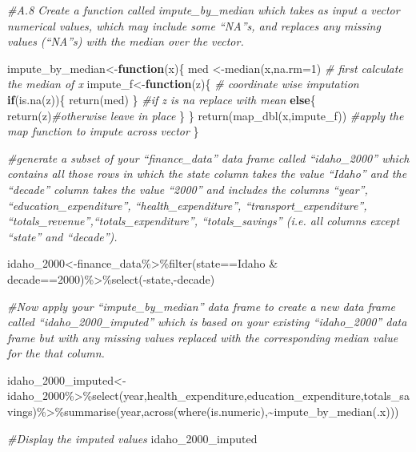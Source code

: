 \documentclass[
]{article}
\newenvironment{Shaded}{\begin{snugshade}}{\end{snugshade}}
\newcommand{\AttributeTok}[1]{\textcolor[rgb]{0.77,0.63,0.00}{#1}}
\newcommand{\CommentTok}[1]{\textcolor[rgb]{0.56,0.35,0.01}{\textit{#1}}}
\newcommand{\ControlFlowTok}[1]{\textcolor[rgb]{0.13,0.29,0.53}{\textbf{#1}}}
\newcommand{\DecValTok}[1]{\textcolor[rgb]{0.00,0.00,0.81}{#1}}
\newcommand{\FunctionTok}[1]{\textcolor[rgb]{0.00,0.00,0.00}{#1}}
\newcommand{\NormalTok}[1]{#1}
\newcommand{\OtherTok}[1]{\textcolor[rgb]{0.56,0.35,0.01}{#1}}
\newcommand{\SpecialCharTok}[1]{\textcolor[rgb]{0.00,0.00,0.00}{#1}}
\newcommand{\StringTok}[1]{\textcolor[rgb]{0.31,0.60,0.02}{#1}}
\begin{document}
\begin{Shaded}
\begin{Highlighting}[]
\CommentTok{\#A.8 Create a function called impute\_by\_median which takes as input a vector numerical values, which may include some “NA”s, and replaces any missing values (“NA”s) with the median over the vector.}

\NormalTok{impute\_by\_median}\OtherTok{\textless{}{-}}\ControlFlowTok{function}\NormalTok{(x)\{}
\NormalTok{med }\OtherTok{\textless{}{-}}\FunctionTok{median}\NormalTok{(x,}\AttributeTok{na.rm=}\DecValTok{1}\NormalTok{)   }\CommentTok{\# first calculate the median of x}
\NormalTok{impute\_f}\OtherTok{\textless{}{-}}\ControlFlowTok{function}\NormalTok{(z)\{  }\CommentTok{\# coordinate wise imputation}
\ControlFlowTok{if}\NormalTok{(}\FunctionTok{is.na}\NormalTok{(z))\{}
\FunctionTok{return}\NormalTok{(med)}
\NormalTok{\}  }\CommentTok{\#if z is na replace with mean}
\ControlFlowTok{else}\NormalTok{\{}
\FunctionTok{return}\NormalTok{(z)}\CommentTok{\#otherwise leave in place}
\NormalTok{\} }
\NormalTok{\}}
\FunctionTok{return}\NormalTok{(}\FunctionTok{map\_dbl}\NormalTok{(x,impute\_f)) }\CommentTok{\#apply the map function to impute across vector}
\NormalTok{\}}

\CommentTok{\#generate a subset of your “finance\_data” data frame called “idaho\_2000” which contains all those rows in which the state column takes the value “Idaho” and the “decade” column takes the value “2000” and includes the columns “year”, “education\_expenditure”, “health\_expenditure”, “transport\_expenditure”, “totals\_revenue”,“totals\_expenditure”, “totals\_savings” (i.e. all columns except “state” and “decade”).}


\NormalTok{idaho\_2000}\OtherTok{\textless{}{-}}\NormalTok{finance\_data}\SpecialCharTok{\%\textgreater{}\%}\FunctionTok{filter}\NormalTok{(state}\SpecialCharTok{==}\StringTok{\textquotesingle{}Idaho\textquotesingle{}} \SpecialCharTok{\&}\NormalTok{ decade}\SpecialCharTok{==}\DecValTok{2000}\NormalTok{)}\SpecialCharTok{\%\textgreater{}\%}\FunctionTok{select}\NormalTok{(}\SpecialCharTok{{-}}\NormalTok{state,}\SpecialCharTok{{-}}\NormalTok{decade)}

\CommentTok{\#Now apply your “impute\_by\_median” data frame to create a new data frame called “idaho\_2000\_imputed” which is based on your existing “idaho\_2000” data frame but with any missing values replaced with the corresponding median value for the that column. }

\NormalTok{idaho\_2000\_imputed}\OtherTok{\textless{}{-}}\NormalTok{idaho\_2000}\SpecialCharTok{\%\textgreater{}\%}\FunctionTok{select}\NormalTok{(year,health\_expenditure,education\_expenditure,totals\_savings)}\SpecialCharTok{\%\textgreater{}\%}\FunctionTok{summarise}\NormalTok{(year,}\FunctionTok{across}\NormalTok{(}\FunctionTok{where}\NormalTok{(is.numeric),}\SpecialCharTok{\textasciitilde{}}\FunctionTok{impute\_by\_median}\NormalTok{(.x)))}

\CommentTok{\#Display the imputed values}
\NormalTok{idaho\_2000\_imputed}
\end{Highlighting}
\end{Shaded}
\end{document}
